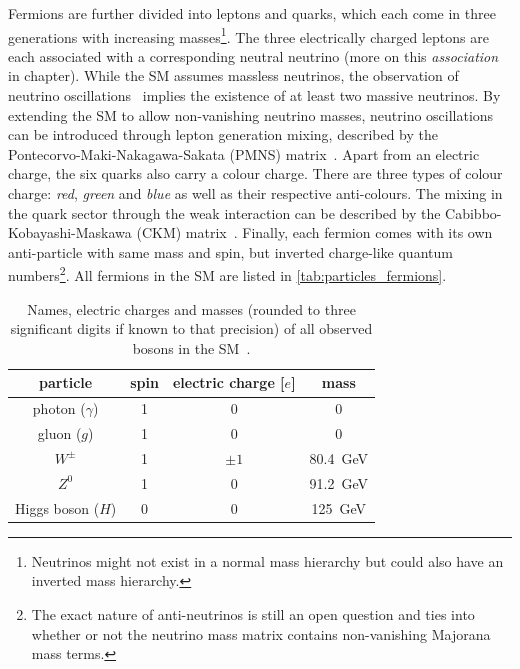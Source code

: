
Fermions are further divided into leptons and quarks, which each come in three generations with increasing masses\footnote{Neutrinos might not exist in a normal mass hierarchy but could also have an inverted mass hierarchy.}. The three electrically charged leptons are each associated with a corresponding neutral neutrino (more on this \textit{association} in chapter). While the SM assumes massless neutrinos, the observation of neutrino oscillations~\cite{Fukuda:1998mi} implies the existence of at least two massive neutrinos. By extending the SM to allow non-vanishing neutrino masses, neutrino oscillations can be introduced through lepton generation mixing, described by the Pontecorvo-Maki-Nakagawa-Sakata (PMNS) matrix~\cite{PMNS:1962mu}. Apart from an electric charge, the six quarks also carry a colour charge. There are three types of colour charge: \textit{red}, \textit{green} and \textit{blue} as well as their respective anti-colours. The mixing in the quark sector through the weak interaction can be described by the Cabibbo-Kobayashi-Maskawa (CKM) matrix~\cite{PhysRevLett.10.531,CKM:1973fv}. Finally, each fermion comes with its own anti-particle with same mass and spin, but inverted charge-like quantum numbers\footnote{The exact nature of anti-neutrinos is still an open question and ties into whether or not the neutrino mass matrix contains non-vanishing Majorana mass terms.}. All fermions in the SM are listed in \cref{tab:particles_fermions}.


\begin{table}
	\centering
	\setlength\heavyrulewidth{0.2ex}
	\small
	\caption{Names, electric charges and masses (rounded to three significant digits if known to that precision) of all observed bosons in the SM~\cite{pdg2020}.}
	\begin{tabular} {c c c c}
	\toprule
		particle & spin & electric charge [$e$]& mass \\ 
	\midrule
		photon ($\gamma$) & 1 & 0 & 0\\
		gluon ($g$) & 1 & 0 & 0 \\
		$W^\pm$ & 1 & $\pm 1$ & \SI{80.4}{\GeV} \\
		$Z^0$ & 1 & 0 & \SI{91.2}{\GeV} \\
		Higgs boson ($H$) & 0 & 0 & \SI{125}{\GeV} \\
	\bottomrule					
	\end{tabular}\vspace{3mm}
	\label{tab:particles_bosons}   
\end{table}

